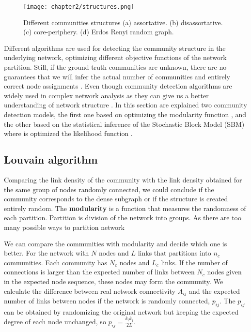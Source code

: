 \begin{figure}[h]
	\centering
	\texttt{[image: chapter2/structures.png]}
	\caption[Stochastic Block Model]{ Different communities structures  (a) assortative. (b) disassortative. (c) core-periphery. (d) Erdos Renyi random graph.}
	\label{fig:SBM}
\end{figure}

Different algorithms are used for detecting the community structure in the underlying network, optimizing different objective functions of the network partition. Still, if the ground-truth communities are unknown, there are no guarantees that we will infer the actual number of communities and entirely correct node assignments \cite{peel2017ground}. Even though community detection algorithms are widely used in complex network analysis as they can give us a better understanding of network structure \cite{peel2017ground, cherifi2019community}.  %
In this section are explained two community detection models, the first one based on optimizing the modularity function \cite{fortunato2010community, guimera2004modularity}, and the other based on the statistical inference of the Stochastic Block Model (SBM) where is optimized the likelihood function \cite{fortunato2010community, lee2019review, peixoto2019bayesian}. %

\subsection{Louvain algorithm}

Comparing the link density of the community with the link density obtained for the same group of nodes randomly connected, we could conclude if the community corresponds to the dense subgraph or if the structure is created entirely random. The \textbf{modularity} \cite{newman2004finding, guimera2004modularity, good2010performance} is a function that measures the randomness of each partition. %
Partition is division of the network into groups. As there are too many possible ways to partition network


We can compare the communities with modularity and decide which one is better. For the network with $N$ nodes and $L$ links that partitions into $n_c$ communities. Each community has $N_c$ nodes and $L_c$ links. If the number of connections is larger than the expected number of links between $N_c$ nodes given in the expected node sequence, these nodes may form the community. We calculate the difference between real network connectivity $A_{ij}$ and the expected number of links between nodes if the network is randomly connected, $p_{ij}$. The $p_{ij}$ can be obtained by randomizing the original network but keeping the expected degree of each node unchanged, so $p_{ij}= \frac{k_ik_j}{2L}$.

